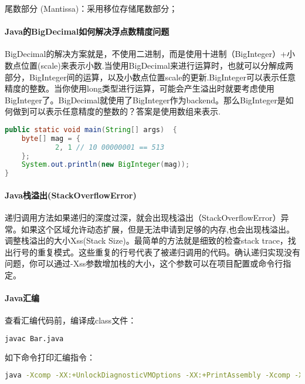 \documentclass[../../../interview-questions.tex]{subfiles}
\begin{document}
尾数部分 (Mantissa)：采用移位存储尾数部分；

\paragraph{Java的BigDecimal如何解决浮点数精度问题}

BigDecimal的解决方案就是，不使用二进制，而是使用十进制（BigInteger）+小数点位置(scale)来表示小数.当使用BigDecimal来进行运算时，也就可以分解成两部分，BigInteger间的运算，以及小数点位置scale的更新.BigInteger可以表示任意精度的整数。当你使用long类型进行运算，可能会产生溢出时就要考虑使用BigInteger了。BigDecimal就使用了BigInteger作为backend。那么BigInteger是如何做到可以表示任意精度的整数的？答案是使用数组来表示.

\begin{lstlisting}[language=Java]
public static void main(String[] args)  {
    byte[] mag = {
            2, 1 // 10 00000001 == 513
    };
    System.out.println(new BigInteger(mag));
}
\end{lstlisting}


\paragraph{Java栈溢出(StackOverflowError)}

递归调用方法如果递归的深度过深，就会出现栈溢出（StackOverflowError）异常。如果这个区域允许动态扩展，但是无法申请到足够的内存,也会出现栈溢出。调整栈溢出的大小Xss(Stack Size)。最简单的方法就是细致的检查stack trace，找出行号的重复模式。这些重复的行号代表了被递归调用的代码。确认递归实现没有问题，你可以通过-Xss参数增加栈的大小，这个参数可以在项目配置或命令行指定。

\paragraph{Java汇编}

查看汇编代码前，编译成class文件：

\begin{lstlisting}[language=Bash]
javac Bar.java
\end{lstlisting}


如下命令打印汇编指令：

\begin{lstlisting}[language=Bash]
java -Xcomp -XX:+UnlockDiagnosticVMOptions -XX:+PrintAssembly -Xcomp -XX:CompileCommand=dontinline,*Bar.sum -XX:CompileCommand=compileonly,*Bar.sum Bar
\end{lstlisting}
\end{document}
